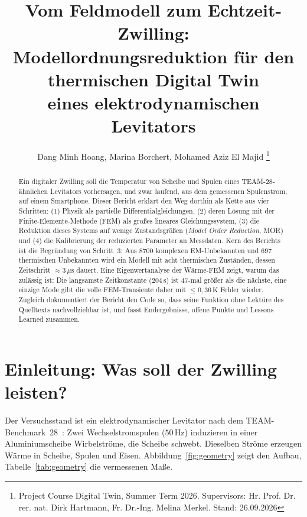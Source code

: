 \documentclass[a4paper, 10pt, conference]{ieeeconf}
\title{\LARGE \bf
Vom Feldmodell zum Echtzeit-Zwilling:\\
Modellordnungsreduktion für den thermischen Digital Twin\\
eines elektrodynamischen Levitators
}
\author{Dang Minh Hoang, Marina Borchert, Mohamed Aziz El Majid
\thanks{Project Course Digital Twin, Summer Term 2026. Supervisors: Hr. Prof. Dr. rer. nat. Dirk Hartmann, Fr. Dr.-Ing. Melina Merkel. Stand: 26.09.2026}%
}
\theoremstyle{remark}
\begin{document}
\maketitle
\thispagestyle{plain}
\pagestyle{plain}

\begin{abstract}
Ein digitaler Zwilling soll die Temperatur von Scheibe und Spulen eines
TEAM-28-ähnlichen Levitators vorhersagen, und zwar laufend, aus dem
gemessenen Spulenstrom, auf einem Smartphone. Dieser Bericht erklärt den
Weg dorthin als Kette aus vier Schritten: (1) Physik als partielle
Differentialgleichungen, (2) deren Lösung mit der Finite-Elemente-Methode
(FEM) als großes lineares Gleichungssystem, (3) die Reduktion dieses
Systems auf wenige Zustandsgrößen (\emph{Model Order Reduction}, MOR) und
(4) die Kalibrierung der reduzierten Parameter an Messdaten. Kern des
Berichts ist die Begründung von Schritt~3: Aus $8700$ komplexen
EM-Unbekannten und $697$ thermischen Unbekannten wird ein Modell mit acht
thermischen Zuständen, dessen Zeitschritt $\approx3\,\mu\mathrm s$ dauert.
Eine Eigenwertanalyse der Wärme-FEM zeigt, warum das zulässig ist: Die
langsamste Zeitkonstante ($204\,\mathrm s$) ist $47$-mal größer als die
nächste, eine einzige Mode gibt die volle FEM-Transiente daher mit
$\le0{,}36\,\mathrm K$ Fehler wieder. Zugleich dokumentiert der Bericht den
Code so, dass seine Funktion ohne Lektüre des Quelltexts nachvollziehbar
ist, und fasst Endergebnisse, offene Punkte und Lessons Learned zusammen.
\end{abstract}

\section{Einleitung: Was soll der Zwilling leisten?}
\label{sec:intro}

Der Versuchsstand ist ein elektrodynamischer Levitator nach dem
TEAM-Benchmark~28~\cite{team28}: Zwei Wechselstromspulen ($50\,\mathrm{Hz}$)
induzieren in einer Aluminiumscheibe Wirbelströme, die Scheibe schwebt.
Dieselben Ströme erzeugen Wärme in Scheibe, Spulen und Eisen.
Abbildung~\ref{fig:geometry} zeigt den Aufbau, Tabelle~\ref{tab:geometry}
die vermessenen Maße.
\end{document}
